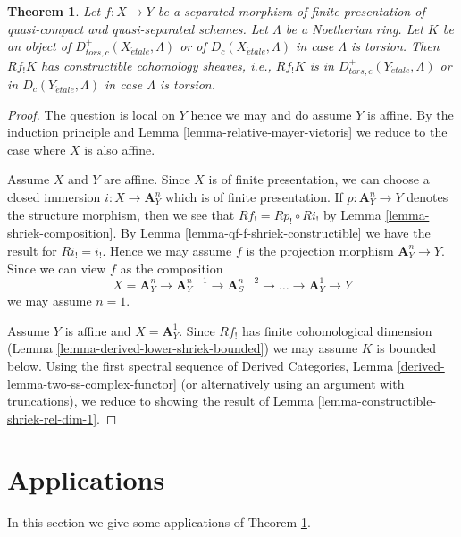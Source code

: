\documentclass{stacks-project}
\theoremstyle{plain}
\newtheorem{theorem}[subsection]{Theorem}
\theoremstyle{definition}
\theoremstyle{remark}
\numberwithin{equation}{subsection}
\def\etale{{\acute{e}tale}}
\begin{document}
\begin{theorem}
\label{theorem-constructible-shriek}
Let $f : X \to Y$ be a separated morphism of finite presentation
of quasi-compact and quasi-separated schemes. Let $\Lambda$ be a
Noetherian ring. Let $K$ be an object of $D^+_{tors, c}(X_\etale, \Lambda)$
or of $D_c(X_\etale, \Lambda)$ in case $\Lambda$ is torsion.
Then $Rf_!K$ has constructible cohomology sheaves, i.e.,
$Rf_!K$ is in $D^+_{tors, c}(Y_\etale, \Lambda)$
or in $D_c(Y_\etale, \Lambda)$ in case $\Lambda$ is torsion.
\end{theorem}

\begin{proof}
The question is local on $Y$ hence we may and do assume $Y$ is affine.
By the induction principle and Lemma \ref{lemma-relative-mayer-vietoris}
we reduce to the case where $X$ is also affine.

\medskip\noindent
Assume $X$ and $Y$ are affine. Since $X$ is of finite presentation,
we can choose a closed immersion $i : X \to \mathbf{A}^n_Y$ which is
of finite presentation. If $p : \mathbf{A}^n_Y \to Y$ denotes
the structure morphism, then we see that $Rf_! = Rp_! \circ Ri_!$
by Lemma \ref{lemma-shriek-composition}. By
Lemma \ref{lemma-qf-f-shriek-constructible}
we have the result for $Ri_! = i_!$. Hence we may assume $f$
is the projection morphism $\mathbf{A}^n_Y \to Y$.
Since we can view $f$ as the composition
$$
X = \mathbf{A}^n_Y \to \mathbf{A}^{n - 1}_Y \to
\mathbf{A}^{n - 2}_S \to \ldots \to
\mathbf{A}^1_Y \to Y
$$
we may assume $n = 1$.

\medskip\noindent
Assume $Y$ is affine and $X = \mathbf{A}^1_Y$. Since $Rf_!$ has
finite cohomological dimension
(Lemma \ref{lemma-derived-lower-shriek-bounded})
we may assume $K$ is bounded below. Using the first spectral sequence of
Derived Categories, Lemma \ref{derived-lemma-two-ss-complex-functor}
(or alternatively using an argument with truncations),
we reduce to showing the result of
Lemma \ref{lemma-constructible-shriek-rel-dim-1}.
\end{proof}








\section{Applications}
\label{section-applications}

\noindent
In this section we give some applications of
Theorem \ref{theorem-constructible-shriek}.
\end{document}
